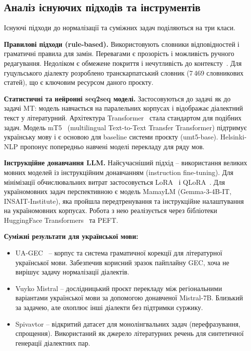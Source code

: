 \documentclass[14pt]{extarticle}
\begin{document}
\subsection{Аналіз існуючих підходів та інструментів}

Існуючі підходи до нормалізації та суміжних задач поділяються на три класи.

\textbf{Правилові підходи (rule-based).} Використовують словники відповідностей і граматичні правила для замін. Перевагами є прозорість і можливість ручного редагування. Недоліком є обмежене покриття і нечутливість до контексту~\cite{pmbok}. Для гуцульського діалекту розроблено транскарпатський словник (7\,469 словникових статей), що є ключовим ресурсом даного проєкту.

\textbf{Статистичні та нейронні seq2seq моделі.} Застосовуються до задачі як до задачі MT: модель навчається на паралельних корпусах і відображає діалектний текст у літературний. Архітектура Transformer~\cite{vaswani} стала стандартом для подібних задач. Модель mT5~\cite{raffel} (multilingual Text-to-Text Transfer Transformer) підтримує українську мову і є основою для baseline системи проєкту (umt5-base). Helsinki-NLP пропонує попередньо навчені моделі перекладу для ряду мов.

\textbf{Інструкційне донавчання LLM.} Найсучасніший підхід -- використання великих мовних моделей із інструкційним донавчанням (instruction fine-tuning). Для мінімізації обчислювальних витрат застосовується LoRA~\cite{lora} і QLoRA~\cite{qlora}. Для україномовних задач перспективною є модель MamayLM (Gemma-3-4B-IT, INSAIT-Institute), яка пройшла передтренування та інструкційне налаштування на україномовних корпусах. Робота з нею реалізується через бібліотеки HuggingFace Transformers~\cite{hf_transformers} та PEFT.

\textbf{Суміжні результати для української мови:}
\begin{itemize}
  \item UA-GEC~\cite{uagec} -- корпус та система граматичної корекції для літературної української мови. Забезпечив корисний зразок пайплайну GEC, хоча не вирішує задачу нормалізації діалектів.
  \item Vuyko Mistral -- дослідницький проєкт перекладу між регіональними варіантами україн\-ської мови за допомогою донавченої Mistral-7B. Близький за задачею, але охоплює інші діалекти без підтримки суржику.
  \item Spivavtor -- відкритий датасет для монолінгвальних задач (перефразування, спрощення). Використаний як джерело літературних речень для синтетичної генерації діалектних пар.
\end{itemize}
\end{document}

